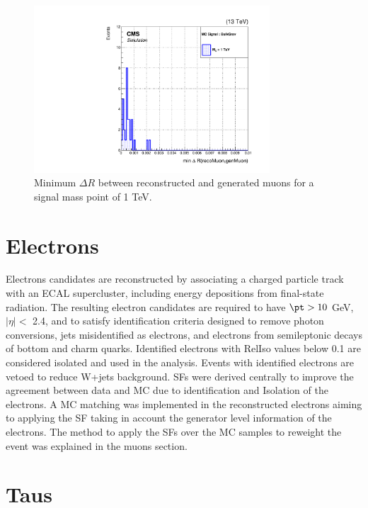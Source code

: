 \begin{figure}[!ht]
\caption{Minimum $\Delta R$ between reconstructed and generated muons for a signal mass point of 1 TeV.}
\begin{center}
  \includegraphics[width=250pt]{figuresCONDI/OBj/matchingmuons.pdf} 
\end{center}
\label{fig:Match}
\end{figure}

\section{Electrons}

Electrons candidates are reconstructed by associating a charged particle track with an ECAL supercluster, including energy depositions from final-state radiation. The resulting electron candidates are required to have $\pt > 10$ GeV, $\left| \eta\right| <$ 2.4, and to satisfy identification criteria designed to remove photon conversions, jets misidentified as electrons, and electrons from semileptonic decays of bottom and charm quarks. Identified electrons with RelIso values below 0.1 are considered isolated and used in the analysis. Events with identified electrons are vetoed to reduce W+jets background. SFs were derived centrally to improve the agreement between data and MC due to identification and Isolation of the electrons. A MC matching was implemented in the reconstructed electrons aiming to applying the SF taking in account the generator level information of the electrons. The method to apply the SFs over the MC samples to reweight the event was explained in the muons section.


\section{Taus}


